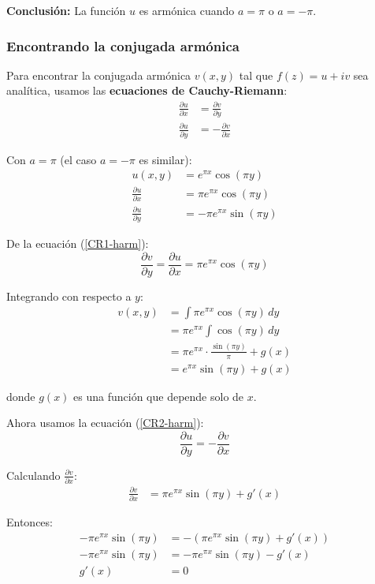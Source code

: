 \documentclass{article}
\begin{document}
\textbf{Conclusión:} La función $u$ es armónica cuando $a = \pi$ o $a = -\pi$.

\subsubsection*{Encontrando la conjugada armónica}

Para encontrar la conjugada armónica $v(x,y)$ tal que $f(z) = u + iv$ sea analítica, usamos las \textbf{ecuaciones de Cauchy-Riemann}:
\begin{align}
\frac{\partial u}{\partial x} &= \frac{\partial v}{\partial y} \label{CR1-harm} \\
\frac{\partial u}{\partial y} &= -\frac{\partial v}{\partial x} \label{CR2-harm}
\end{align}

Con $a = \pi$ (el caso $a = -\pi$ es similar):
\begin{align*}
u(x,y) &= e^{\pi x}\cos(\pi y) \\
\frac{\partial u}{\partial x} &= \pi e^{\pi x}\cos(\pi y) \\
\frac{\partial u}{\partial y} &= -\pi e^{\pi x}\sin(\pi y)
\end{align*}

De la ecuación (\ref{CR1-harm}):
$$\frac{\partial v}{\partial y} = \frac{\partial u}{\partial x} = \pi e^{\pi x}\cos(\pi y)$$

Integrando con respecto a $y$:
\begin{align*}
v(x,y) &= \int \pi e^{\pi x}\cos(\pi y) \, dy \\
       &= \pi e^{\pi x} \int \cos(\pi y) \, dy \\
       &= \pi e^{\pi x} \cdot \frac{\sin(\pi y)}{\pi} + g(x) \\
       &= e^{\pi x}\sin(\pi y) + g(x)
\end{align*}

donde $g(x)$ es una función que depende solo de $x$.

Ahora usamos la ecuación (\ref{CR2-harm}):
$$\frac{\partial u}{\partial y} = -\frac{\partial v}{\partial x}$$

Calculando $\frac{\partial v}{\partial x}$:
\begin{align*}
\frac{\partial v}{\partial x} &= \pi e^{\pi x}\sin(\pi y) + g'(x)
\end{align*}

Entonces:
\begin{align*}
-\pi e^{\pi x}\sin(\pi y) &= -\left(\pi e^{\pi x}\sin(\pi y) + g'(x)\right) \\
-\pi e^{\pi x}\sin(\pi y) &= -\pi e^{\pi x}\sin(\pi y) - g'(x) \\
g'(x) &= 0
\end{align*}
\end{document}
